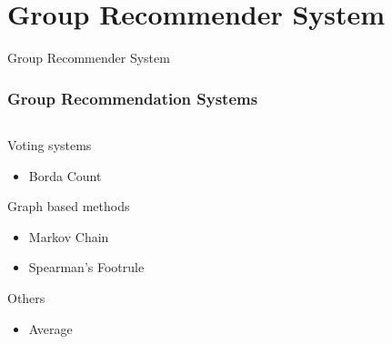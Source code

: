 \section{Group Recommender System}
\begin{frame}
     \begin{center}
     	\huge Group Recommender System 
     \end{center}
\end{frame}
\begin{frame}
\frametitle{Group Recommendation Systems}
	\begin{columns}
		\begin{column}{0.5\textwidth}
		Voting systems
\begin{itemize}
\item Borda Count
\end{itemize}
Graph based methods
\begin{itemize}
\item Markov Chain 
\item Spearman's Footrule
\end{itemize}
Others
\begin{itemize}
\item Average
\end{itemize}
		\end{column}
		\begin{column}{0.5\textwidth}
		\begin{figure}
		\centering

\end{figure}
\end{column}
\end{columns}
\end{frame}
